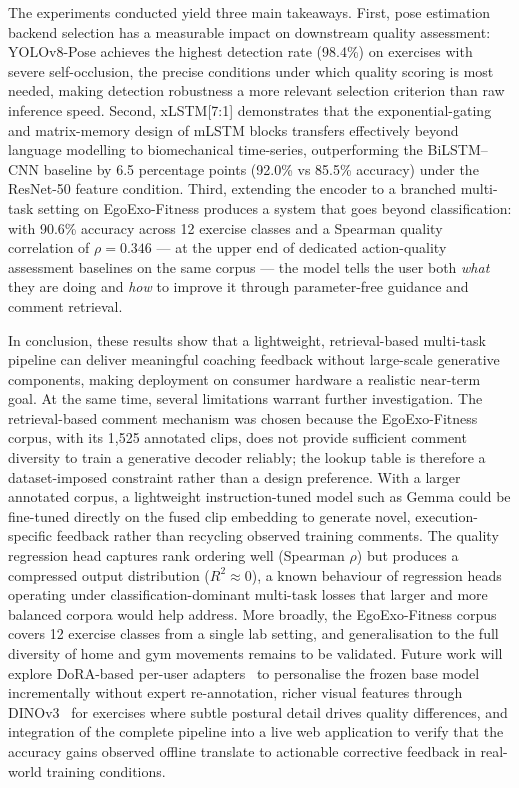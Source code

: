 \documentclass[conference,onecolumn,oneside]{IEEEtran}
\begin{document}
The experiments conducted yield three main takeaways. First, pose
estimation backend selection has a measurable impact on downstream
quality assessment: YOLOv8-Pose achieves the highest detection rate
(98.4\%) on exercises with severe self-occlusion, the precise
conditions under which quality scoring is most needed, making
detection robustness a more relevant selection criterion than
raw inference speed. Second, xLSTM[7:1] demonstrates that the
exponential-gating and matrix-memory design of mLSTM blocks transfers
effectively beyond language modelling to biomechanical time-series,
outperforming the BiLSTM--CNN baseline by 6.5 percentage points
(92.0\% vs 85.5\% accuracy) under the ResNet-50 feature condition.
Third, extending the encoder to a branched multi-task setting on
EgoExo-Fitness produces a system that goes beyond classification:
with 90.6\% accuracy across 12 exercise classes and a Spearman
quality correlation of $\rho{=}0.346$ --- at the upper end of
dedicated action-quality assessment baselines on the same corpus ---
the model tells the user both \emph{what} they are doing and
\emph{how} to improve it through parameter-free guidance and
comment retrieval.

In conclusion, these results show that a lightweight, retrieval-based
multi-task pipeline can deliver meaningful coaching feedback without
large-scale generative components, making deployment on consumer
hardware a realistic near-term goal. At the same time, several
limitations warrant further investigation. The retrieval-based comment
mechanism was chosen because the EgoExo-Fitness corpus, with its
1{,}525 annotated clips, does not provide sufficient comment diversity
to train a generative decoder reliably; the lookup table is therefore
a dataset-imposed constraint rather than a design preference. With a
larger annotated corpus, a lightweight instruction-tuned model such as
Gemma could be fine-tuned directly on the fused clip embedding to
generate novel, execution-specific feedback rather than recycling
observed training comments. The quality regression head captures rank ordering
well (Spearman $\rho$) but produces a compressed output distribution
($R^2 \approx 0$), a known behaviour of regression heads operating
under classification-dominant multi-task losses that larger and more
balanced corpora would help address. More broadly, the
EgoExo-Fitness corpus covers 12 exercise classes from a single lab
setting, and generalisation to the full diversity of home and gym
movements remains to be validated. Future work will explore
DoRA-based per-user adapters~\cite{5} to personalise the frozen
base model incrementally without expert re-annotation, richer
visual features through DINOv3~\cite{dino2023} for exercises where
subtle postural detail drives quality differences, and integration
of the complete pipeline into a live web application to verify that
the accuracy gains observed offline translate to actionable corrective
feedback in real-world training conditions.
\end{document}
